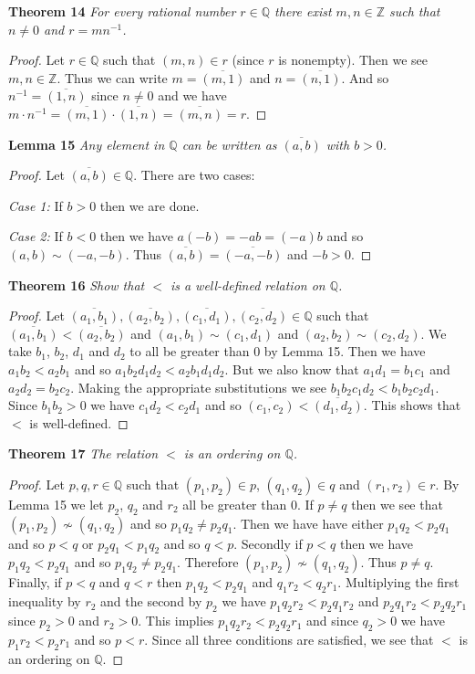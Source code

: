 \documentclass{article}
\begin{document}
\begin{flushleft}
\textbf{Theorem 14}
\textsl{For every rational number $r \in \mathbb{Q}$ there exist $m,n \in \mathbb{Z}$ such that $n \neq 0$ and $r=mn^{-1}$.}
\begin{proof}
Let $r \in \mathbb{Q}$ such that $(m,n) \in r$ (since $r$ is nonempty). Then we see $m,n \in \mathbb{Z}$. Thus we can write $m=\overline{(m,1)}$ and $n=\overline{(n,1)}$. And so $n^{-1}=\overline{(1,n)}$ since $n \neq 0$ and we have $m \cdot n^{-1} = \overline{(m,1)} \cdot \overline{(1,n)} = \overline{(m,n)} = r$.
\end{proof}

\textbf{Lemma 15}
\textsl{Any element in $\mathbb{Q}$ can be written as $\overline{(a,b)}$ with $b>0$.}
\begin{proof}
Let $\overline{(a,b)} \in \mathbb{Q}$. There are two cases:\newline

\textsl{Case 1:} If $b>0$ then we are done.\newline

\textsl{Case 2:} If $b<0$ then we have $a(-b)=-ab=(-a)b$ and so $(a,b) \sim (-a,-b)$. Thus $\overline{(a,b)} = \overline{(-a,-b)}$ and $-b>0$.
\end{proof}

\textbf{Theorem 16}
\textsl{Show that $<$ is a well-defined relation on $\mathbb{Q}$.}
\begin{proof}
Let $\overline{(a_1,b_1)},\overline{(a_2,b_2)},\overline{(c_1,d_1)},\overline{(c_2,d_2)} \in \mathbb{Q}$ such that $\overline{(a_1,b_1)} < \overline{(a_2,b_2)}$ and $(a_1,b_1) \sim (c_1,d_1)$ and $(a_2,b_2) \sim (c_2,d_2)$. We take $b_1$, $b_2$, $d_1$ and $d_2$ to all be greater than $0$ by Lemma 15. Then we have $a_1b_2 < a_2b_1$ and so $a_1b_2d_1d_2 < a_2b_1d_1d_2$. But we also know that $a_1d_1=b_1c_1$ and $a_2d_2=b_2c_2$. Making the appropriate substitutions we see $b_1b_2c_1d_2 < b_1b_2c_2d_1$. Since $b_1b_2>0$ we have $c_1d_2<c_2d_1$ and so $\overline{(c_1,c_2)} < \overline{(d_1,d_2)}$. This shows that $<$ is well-defined.
\end{proof}

\textbf{Theorem 17}
\textsl{The relation $<$ is an ordering on $\mathbb{Q}$.}
\begin{proof}
Let $p,q,r \in \mathbb{Q}$ such that $(p_1,p_2) \in p$, $(q_1,q_2) \in q$ and $(r_1,r_2) \in r$. By Lemma 15 we let $p_2$, $q_2$ and $r_2$ all be greater than $0$. If $p \neq q$ then we see that $(p_1,p_2) \nsim (q_1,q_2)$ and so $p_1q_2 \neq p_2q_1$. Then we have have either $p_1q_2<p_2q_1$ and so $p<q$ or $p_2q_1<p_1q_2$ and so $q<p$. Secondly if $p<q$ then we have $p_1q_2<p_2q_1$ and so $p_1q_2 \neq p_2q_1$. Therefore $(p_1,p_2) \nsim (q_1,q_2)$. Thus $p \neq q$. Finally, if $p<q$ and $q<r$ then $p_1q_2<p_2q_1$ and $q_1r_2<q_2r_1$. Multiplying the first inequality by $r_2$ and the second by $p_2$ we have $p_1q_2r_2<p_2q_1r_2$ and $p_2q_1r_2<p_2q_2r_1$ since $p_2>0$ and $r_2>0$. This implies $p_1q_2r_2<p_2q_2r_1$ and since $q_2>0$ we have $p_1r_2<p_2r_1$ and so $p<r$. Since all three conditions are satisfied, we see that $<$ is an ordering on $\mathbb{Q}$.
\end{proof}


\end{flushleft}
\end{document}
